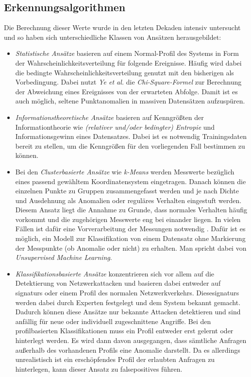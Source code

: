 \subsection{Erkennungsalgorithmen}
Die Berechnung dieser Werte wurde in den letzten Dekaden intensiv untersucht und so haben sich unterschiedliche Klassen von Ansätzen herausgebildet\cite{ahmed2016survey}:
\begin{itemize}
\item \textit{Statistische Ansätze} basieren auf einem Normal-Profil des Systems in Form der Wahrscheinlichkeitsverteilung für folgende Ereignisse. Häufig wird dabei die bedingte Wahrscheinlichkeitsverteilung genutzt mit den bisherigen als Vorbedingung. Dabei nutzt \textit{Ye et al.} \cite{ye2001anomaly} die \textit{Chi-Square-Formel} zur Berechnung der Abweichung eines Ereignisses von der erwarteten Abfolge. Damit ist es auch möglich, seltene Punktanomalien in massiven Datensätzen aufzuspüren.
\item \textit{Informationstheoretische Ansätze} basieren auf Kenngrößten der Informationtheorie wie \textit{(relativer und/oder bedingter) Entropie} und Informationsgewinn eines Datensatzes. Dabei ist es notwendig Trainingsdaten bereit zu stellen, um die Kenngrößen für den vorliegenden Fall bestimmen zu können. \cite{noble2003graph}
\item Bei den \textit{Clusterbasierte Ansätze} wie \textit{k-Means}\cite{likas2003global} werden Messwerte bezüglich eines passend gewähltem Koordinatensystem eingetragen. Danach können die einzelnen Punkte zu Gruppen zusammengefasst werden und je nach Dichte und Ausdehnung als Anomalien oder reguläres Verhalten eingestuft werden. Diesem Ansatz liegt die Annahme zu Grunde, dass normales Verhalten häufig vorkommt und die zugehörigen Messwerte eng bei einander liegen. In vielen Fällen ist dafür eine Vorverarbeitung der Messungen notwendig \cite{munz2007traffic}. Dafür ist es möglich, ein Modell zur Klassifikation von einem Datensatz ohne Markierung der Messpunkte (ob Anomalie oder nicht) zu erhalten. Man spricht dabei von \textit{Unsupervised Machine Learning}\cite{munz2007traffic}.
\item \textit{Klassifikationsbasierte Ansätze} konzentrieren sich vor allem auf die Detektierung von Netzwerkattacken und basieren dabei entweder auf \Glspl{signatur} oder einem Profil des normalen Netzwerkverkehrs. Diese\Glspl{signatur} werden dabei durch Experten festgelegt und dem System bekannt gemacht. Dadurch können diese Ansätze nur bekannte Attacken detektieren und sind anfällig für neue oder individuell zugeschnittene Angriffe. Bei den profilbasierten Klassifikationen muss ein Profil entweder erst gelernt oder hinterlegt werden. Es wird dann davon ausgegangen, dass sämtliche Anfragen außerhalb des vorhandenen Profils eine Anomalie darstellt. Da es allerdings unrealistisch ist ein erschöpfendes Profil der erlaubten Anfragen zu hinterlegen, kann dieser Ansatz zu \Glspl{falsepositive} führen. 
\end{itemize}
